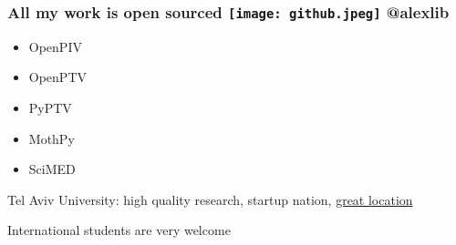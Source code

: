 \begin{frame}[label=intro-2]
\frametitle{ All my work is open sourced \hfill \texttt{[image: github.jpeg]} @alexlib }
\begin{multicols}{2}
\begin{card}
\begin{itemize}
\item OpenPIV
\item OpenPTV
\item PyPTV
\item MothPy
\item SciMED
\end{itemize}
\end{card}
\end{multicols}
\end{frame}

\begin{frame}[label=intro-3]{Tel Aviv University: high quality research, startup nation, \href{http://www.youtube.com/watch?v=rbUevEuYQHg}{great location }}
\begin{multicols}{2}
\centering
{} 
\end{multicols}
\end{frame}


\begin{frame}[label=intro-4]{International students are very welcome}
\begin{multicols*}{2}
\begin{center}
\end{center}
\end{multicols*}
\end{frame}
